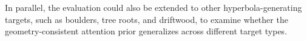 \documentclass[lettersize,journal]{IEEEtran}
\begin{document}
In parallel, the evaluation could also be extended to other hyperbola-generating targets, such as boulders, tree roots, and driftwood, to examine whether the geometry-consistent attention prior generalizes across different target types.





\end{document}
